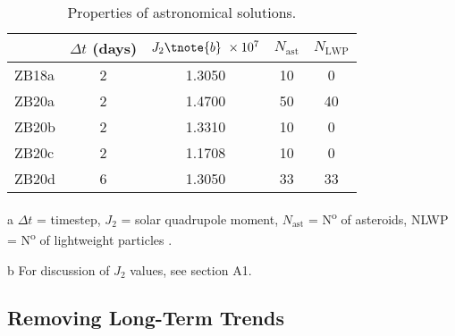 \documentclass[draft]{agujournal2019}
\begin{document}
\begin{table}
\begin{threeparttable}
\caption{Properties of astronomical solutions.\label{tab:astronomical-solutions}}
\centering
\begin{tabular}{lcccc}
 & \(\Delta{}t\) (days) & \(J_{2}\tnote{b}~\times10^{7}\) & \(N_{\text{ast}}\) & \(N_{\text{LWP}}\) \\
\hline
ZB18a & 2 & \num{1.3050} & 10 & 0 \\
ZB20a & 2 & \num{1.4700} & 50 & 40 \\
ZB20b & 2 & \num{1.3310} & 10 & 0 \\
ZB20c & 2 & \num{1.1708} & 10 & 0 \\
ZB20d & 6 & \num{1.3050} & 33 & 33 \\
\end{tabular}
\begin{tablenotes}
  \item [a] \(\Delta{}t\) = timestep, \(J_{2}\) = solar quadrupole moment, \(N_{\text{ast}}\) = N\textsuperscript{o} of asteroids, NLWP = N\textsuperscript{o} of lightweight particles \cite<table adapted from>[]{ZeebeLourens2022EPSL}.
  \item [b] For discussion of \(J_{2}\) values, see  section A1.
\end{tablenotes}
\end{threeparttable}
\end{table}



\subsection{Removing Long-Term Trends}\label{sec:detrend}
\end{document}
